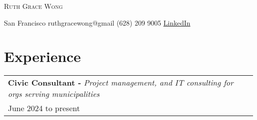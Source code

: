 \documentclass[letterpaper, oneside, final]{scrartcl} %
\begin{document}
\setlength{\pdfpagewidth}{8.5in}
\setlength{\pdfpageheight}{11in}

\begin{center} %


{\fontsize{36}{36}\spaceskip=12pt\selectfont\scshape Ruth Grace Wong} %

\vspace{1cm} %

{\renewcommand{\headfont}{\normalfont\rmfamily\scshape} %
\fontsize{12.5}{17}\selectfont\scshape %

San Francisco  {\large\textperiodcentered} ruthgracewong@gmail {\large\textperiodcentered} (628) 209 9005 {\large\textperiodcentered} \underline{\href{https://www.linkedin.com/in/ruthgracewong/}{LinkedIn}}
}

\vspace{0.2cm}


\section{Experience}

\renewcommand{\arraystretch}{1.3}

\begingroup\setlength{\fboxsep}{0pt}
\colorbox{mygray}{
\begin{flushleft}
\begin{tabularx}{\textwidth}{l}
\textbf{Civic Consultant -} \textit{Project management, and IT consulting for orgs serving municipalities}\\
June 2024 to present\\
\end{tabularx}
\end{flushleft}
}\endgroup
\vspace{-0.1cm}
\begin{itemize} \itemsep-0.2cm


\end{itemize}
\end{center}
\end{document}
